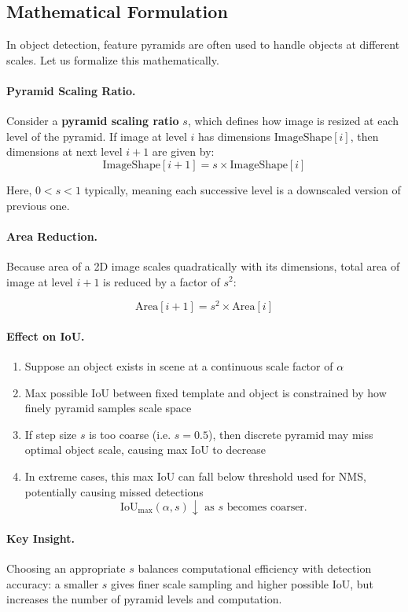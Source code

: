 \documentclass[12pt]{article}
\begin{document}
\subsection{Mathematical Formulation}

In object detection, feature pyramids are often used to handle objects at different scales. Let us formalize this mathematically.

\paragraph{Pyramid Scaling Ratio.} Consider a \textbf{pyramid scaling ratio} $s$, which defines how image is resized at each level of the pyramid. If image at level $i$ has dimensions $\text{ImageShape}[i]$, then dimensions at next level $i+1$ are given by:
\[
    \text{ImageShape}[i+1] = s \times \text{ImageShape}[i]
\]

\noindent Here, $0 < s < 1$ typically, meaning each successive level is a downscaled version of previous one.

\paragraph{Area Reduction.} Because area of a 2D image scales quadratically with its dimensions, total area of image at level $i+1$ is reduced by a factor of $s^2$:

\[
    \text{Area}[i+1] = s^2 \times \text{Area}[i]
\]

\paragraph{Effect on IoU.}
\begin{enumerate}
    \item Suppose an object exists in scene at a continuous scale factor of $\alpha$
    \item Max possible IoU between fixed template and object is constrained by how finely pyramid samples scale space
    \item If step size $s$ is too coarse (i.e. $s=0.5$), then discrete pyramid may miss optimal object scale, causing max IoU to decrease
    \item In extreme cases, this max IoU can fall below threshold used for NMS, potentially causing missed detections
          \[
              \text{IoU}_{\max}(\alpha, s) \downarrow \text{ as } s \text{ becomes coarser.}
          \]
\end{enumerate}


\paragraph{Key Insight.} Choosing an appropriate $s$ balances computational efficiency with detection accuracy: a smaller $s$ gives finer scale sampling and higher possible IoU, but increases the number of pyramid levels and computation.
\end{document}
